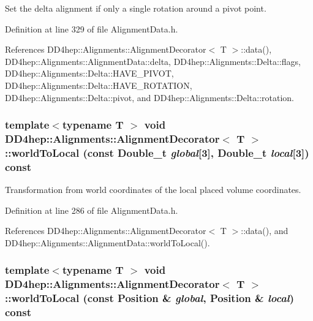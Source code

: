 Set the delta alignment if only a single rotation around a pivot point. 

Definition at line 329 of file AlignmentData.h.

References DD4hep::Alignments::AlignmentDecorator$<$ T $>$::data(), DD4hep::Alignments::AlignmentData::delta, DD4hep::Alignments::Delta::flags, DD4hep::Alignments::Delta::HAVE\_\-PIVOT, DD4hep::Alignments::Delta::HAVE\_\-ROTATION, DD4hep::Alignments::Delta::pivot, and DD4hep::Alignments::Delta::rotation.\hypertarget{class_d_d4hep_1_1_alignments_1_1_alignment_decorator_a5942ce65c6e2de1dd5d04d297208810f}{
\subsubsection[{worldToLocal}]{\setlength{\rightskip}{0pt plus 5cm}template$<$typename T $>$ void {\bf DD4hep::Alignments::AlignmentDecorator}$<$ {\bf T} $>$::worldToLocal (const Double\_\-t {\em global}\mbox{[}3\mbox{]}, \/  Double\_\-t {\em local}\mbox{[}3\mbox{]}) const}}
\label{class_d_d4hep_1_1_alignments_1_1_alignment_decorator_a5942ce65c6e2de1dd5d04d297208810f}


Transformation from world coordinates of the local placed volume coordinates. 

Definition at line 286 of file AlignmentData.h.

References DD4hep::Alignments::AlignmentDecorator$<$ T $>$::data(), and DD4hep::Alignments::AlignmentData::worldToLocal().\hypertarget{class_d_d4hep_1_1_alignments_1_1_alignment_decorator_adc00acec193333d4ddbc4802c8ca72b8}{
\subsubsection[{worldToLocal}]{\setlength{\rightskip}{0pt plus 5cm}template$<$typename T $>$ void {\bf DD4hep::Alignments::AlignmentDecorator}$<$ {\bf T} $>$::worldToLocal (const Position \& {\em global}, \/  Position \& {\em local}) const}}
\label{class_d_d4hep_1_1_alignments_1_1_alignment_decorator_adc00acec193333d4ddbc4802c8ca72b8}


